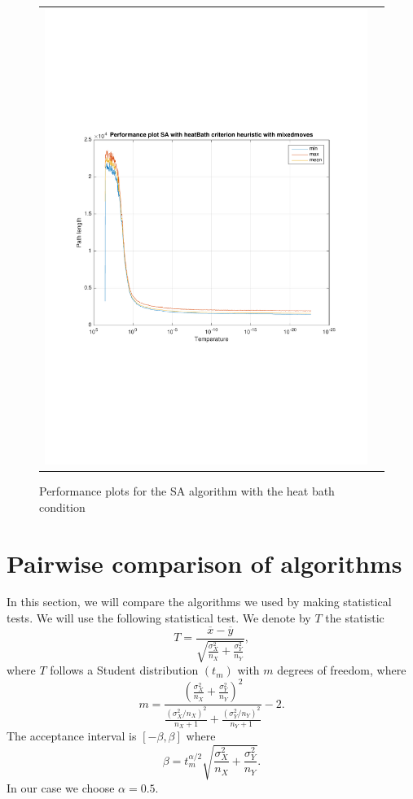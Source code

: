 \documentclass[a4paper, 11pt]{scrartcl}
\begin{document}
\begin{figure}[!ht]
\begin{tabular}{cc}
    \includegraphics[scale=0.4, trim={3cm 6cm 1cm 6cm}]{../figures/perfPlot_SA_heatBath_mixed.pdf}
  \end{tabular}
  \caption{Performance plots for the SA algorithm with the heat bath condition}
  \label{fig:perfPlot-SA-heatBath}
\end{figure}


\section{Pairwise comparison of algorithms}
\label{sec:pairw-comp-algor}

In this section, we will compare the algorithms we used by making statistical tests. We will use the following
statistical test. We denote by $T$ the statistic 
\[ T = \frac{\overline{x} - \overline{y}}{\sqrt{\frac{\sigma_X^2}{n_X} + \frac{\sigma_Y^2}{n_Y}}}, \]
where $T$ follows a Student distribution $(t_m)$ with $m$ degrees of freedom, where 
\[ m = \frac{\left( \frac{\sigma_X^2}{n_X} + \frac{\sigma_Y^2}{n_Y}
    \right)^2}{\frac{(\sigma_X^2/n_X)^2}{n_X+1} + \frac{(\sigma_Y^2/n_Y)^2}{n_Y+1}} - 2. \]
The acceptance interval is $[-\beta, \beta]$ where 
\[ \beta = t_m^{\alpha / 2} \sqrt{\frac{\sigma_X^2}{n_X} + \frac{\sigma_Y^2}{n_Y}}. \]
In our case we choose $\alpha = 0.5$. 
\end{document}
